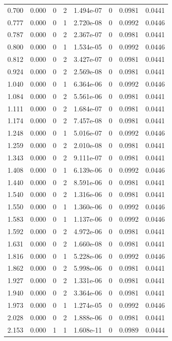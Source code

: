\documentclass[preview]{standalone}
\begin{document}
{{\begin{tabular}{L{1.2cm}C{1.2cm} C{0.3cm}C{0.5cm} C{1.4cm}C{1.4cm} C{1.4cm}C{1.4cm}}
  0.700  &  0.000  & 0     &  2 &  1.494e-07  & 0  & 0.0981 &  0.0441   \\ 
  0.777  &  0.000  & 0     &  1 &  2.720e-08  & 0  & 0.0992 &  0.0446   \\ 
  0.787  &  0.000  & 0     &  2 &  2.367e-07  & 0  & 0.0981 &  0.0441   \\ 
  0.800  &  0.000  & 0     &  1 &  1.534e-05  & 0  & 0.0992 &  0.0446   \\ 
  0.812  &  0.000  & 0     &  2 &  3.427e-07  & 0  & 0.0981 &  0.0441   \\ 
  0.924  &  0.000  & 0     &  2 &  2.569e-08  & 0  & 0.0981 &  0.0441   \\ 
  1.040  &  0.000  & 0     &  1 &  6.364e-06  & 0  & 0.0992 &  0.0446   \\ 
  1.084  &  0.000  & 0     &  2 &  5.561e-06  & 0  & 0.0981 &  0.0441   \\ 
  1.111  &  0.000  & 0     &  2 &  1.684e-07  & 0  & 0.0981 &  0.0441   \\ 
  1.174  &  0.000  & 0     &  2 &  7.457e-08  & 0  & 0.0981 &  0.0441   \\ 
  1.248  &  0.000  & 0     &  1 &  5.016e-07  & 0  & 0.0992 &  0.0446   \\ 
  1.259  &  0.000  & 0     &  2 &  2.010e-08  & 0  & 0.0981 &  0.0441   \\ 
  1.343  &  0.000  & 0     &  2 &  9.111e-07  & 0  & 0.0981 &  0.0441   \\ 
  1.408  &  0.000  & 0     &  1 &  6.139e-06  & 0  & 0.0992 &  0.0446   \\ 
  1.440  &  0.000  & 0     &  2 &  8.591e-06  & 0  & 0.0981 &  0.0441   \\ 
  1.540  &  0.000  & 0     &  2 &  1.316e-06  & 0  & 0.0981 &  0.0441   \\ 
  1.550  &  0.000  & 0     &  1 &  1.360e-06  & 0  & 0.0992 &  0.0446   \\ 
  1.583  &  0.000  & 0     &  1 &  1.137e-06  & 0  & 0.0992 &  0.0446   \\ 
  1.592  &  0.000  & 0     &  2 &  4.972e-06  & 0  & 0.0981 &  0.0441   \\ 
  1.631  &  0.000  & 0     &  2 &  1.660e-08  & 0  & 0.0981 &  0.0441   \\ 
  1.816  &  0.000  & 0     &  1 &  5.228e-06  & 0  & 0.0992 &  0.0446   \\ 
  1.862  &  0.000  & 0     &  2 &  5.998e-06  & 0  & 0.0981 &  0.0441   \\ 
  1.927  &  0.000  & 0     &  2 &  1.331e-06  & 0  & 0.0981 &  0.0441   \\ 
  1.940  &  0.000  & 0     &  2 &  3.364e-06  & 0  & 0.0981 &  0.0441   \\ 
  1.973  &  0.000  & 0     &  1 &  1.274e-05  & 0  & 0.0992 &  0.0446   \\ 
  2.028  &  0.000  & 0     &  2 &  1.888e-06  & 0  & 0.0981 &  0.0441   \\ 
  2.153  &  0.000  & 1     &  1 &  1.608e-11  & 0  & 0.0989 &  0.0444   \\ 
\hline 
\end{tabular} 

}}
\end{document}
